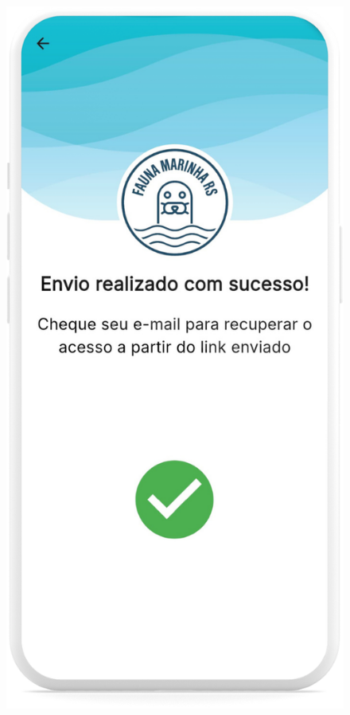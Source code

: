\begin{figure}[H]
    \centering
    \begin{minipage}[t]{0.48\textwidth}
        \centering
        \includegraphics[height=0.72\textheight]{imagens/sistema/device_frame/recuperarSenhaEnvio.png}

\end{minipage}
\end{figure}
